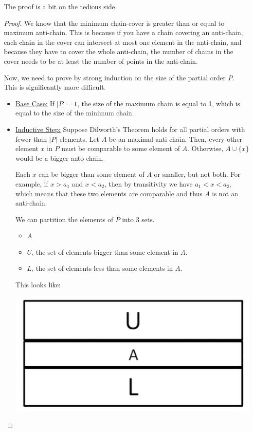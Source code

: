 \documentclass[letterpaper]{article}
\begin{document}
The proof is a bit on the tedious side.
\begin{proof}
    We know that the minimum chain-cover is greater than or equal to maximum anti-chain. This is because if you have a chain covering an anti-chain, each chain in the cover can intersect at most one element in the anti-chain, and because they have to cover the whole anti-chain, the number of chains in the cover needs to be at least the number of points in the anti-chain. 
    
    \bigskip 

    Now, we need to prove by strong induction on the size of the partial order $P$. This is significantly more difficult.
    \begin{itemize}
        \item[\mdiamond] \underline{Base Case:} If $|P| = 1$, the size of the maximum chain is equal to 1, which is equal to the size of the minimum chain. 
        \item[\mdiamond] \underline{Inductive Step:} Suppose Dilworth's Theorem holds for all partial orders with fewer than $|P|$ elements. Let $A$ be an maximal anti-chain. Then, every other element $x$ in $P$ must be comparable to some element of $A$. Otherwise, $A \cup \{x\}$ would be a bigger anto-chain. 
        
        \bigskip 

        Each $x$ can be bigger than some element of $A$ or smaller, but not both. For example, if $x > a_1$ and $x < a_2$, then by transitivity we have $a_1 < x < a_2$, which means that these two elements are comparable and thus $A$ is not an anti-chain. 

        We can partition the elements of $P$ into 3 sets. 
        \begin{itemize}
            \item $A$ 
            \item $U$, the set of elements bigger than some element in $A$. 
            \item $L$, the set of elements less than some elements in $A$. 
        \end{itemize}
        This looks like:
        \begin{center}
            \includegraphics[scale=0.5]{img/dil_pic_proof.PNG}
        \end{center}


\end{itemize}
\end{proof}
\end{document}
